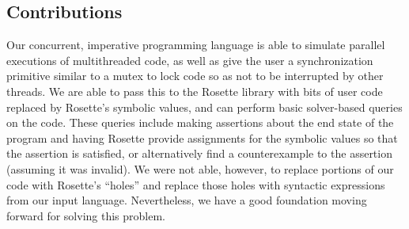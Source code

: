 \subsection{Contributions}
Our concurrent, imperative programming language is able to simulate parallel executions of multithreaded code, as well as give the user a synchronization primitive similar to a mutex to lock code so as not to be interrupted by other threads.  We are able to pass this to the Rosette library with bits of user code replaced by Rosette's symbolic values, and can perform basic solver-based queries on the code.  These queries include making assertions about the end state of the program and having Rosette provide assignments for the symbolic values so that the assertion is satisfied, or alternatively find a counterexample to the assertion (assuming it was invalid).  We were not able, however, to replace portions of our code with Rosette's ``holes'' and replace those holes with syntactic expressions from our input language.  Nevertheless, we have a good foundation moving forward for solving this problem.  
